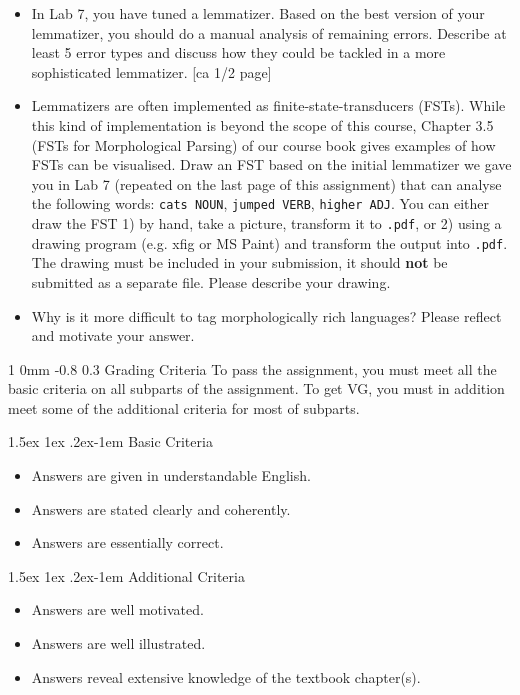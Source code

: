 \documentclass[11pt]{article}
\makeatletter
\renewcommand{\section}{\@startsection
{section}%
{1}%
{0mm}%
{-0.8\baselineskip}%
{0.3\baselineskip}%
{\bfseries\large}}%
\renewcommand{\paragraph}{%
  \@startsection{paragraph}{4}%
  {\z@}{1.5ex \@plus 1ex \@minus .2ex}{-1em}%
  {\normalfont\normalsize\bfseries}%
}\makeatother
\newenvironment{titlemize}[1]{%
    \paragraph{#1}
    \begin{itemize}
        \setlength\itemsep{0pt}}
    {\end{itemize}}
\makeatother
\begin{document}
\begin{itemize}
\item In Lab 7, you have tuned a lemmatizer. Based on the best version
  of your lemmatizer, you should do a manual analysis of remaining
  errors. Describe at least 5 error types and discuss how they could
  be tackled in a more sophisticated lemmatizer. \textcolor{UUred}{[ca
    1/2 page]}
\item Lemmatizers are often implemented as finite-state-transducers
  (FSTs). While this kind of implementation is beyond the scope of
  this course, Chapter 3.5 (FSTs for Morphological Parsing) of our
  course book gives examples of how FSTs can be visualised. Draw an
  FST based on the initial lemmatizer we gave you in Lab 7 (repeated
  on the last page of this assignment) that can analyse the following
  words: \texttt{cats NOUN}, \texttt{jumped VERB}, \texttt{higher
    ADJ}. You can either draw the FST 1) by hand, take a picture,
  transform it to \texttt{.pdf}, or 2) using a drawing program
  (e.g. xfig or MS Paint) and transform the output into
  \texttt{.pdf}. The drawing must be included in your submission, it
  should \textbf{not} be submitted as a separate file. Please describe
  your drawing. %
\item Why is it more difficult to tag morphologically rich languages?
  Please reflect and motivate your answer. %
\end{itemize}

\clearpage
\section{Grading Criteria}
To pass the assignment, you must meet all the basic criteria on all
subparts of the assignment.  To get VG, you must in addition meet some
of the additional criteria for most of subparts.

\begin{titlemize}{Basic Criteria}
    \item Answers are given in understandable English.
    \item Answers are stated clearly and coherently.
    \item Answers are essentially correct.
\end{titlemize}
\begin{titlemize}{Additional Criteria}
    \item Answers are well motivated.
    \item Answers are well illustrated.
    \item Answers reveal extensive knowledge of the textbook chapter(s).
\end{titlemize}
\end{document}
